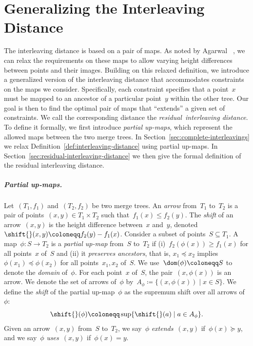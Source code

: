 \section{Generalizing the Interleaving Distance}\label{sec:generalizing-interleaving-distance}
The interleaving distance is based on a pair of maps.
As noted by Agarwal \etal~\cite{agarwal2018computing}, we can relax the requirements on these maps to allow varying height differences between points and their images.
Building on this relaxed definition, we introduce a generalized version of the interleaving distance that accommodates constraints on the maps we consider.
Specifically, each constraint specifies that a point~$x$ must be mapped to an ancestor of a particular point~$y$ within the other tree.
Our goal is then to find the optimal pair of maps that ``extends'' a given set of constraints.
We call the corresponding distance the \emph{residual~interleaving distance}.
To define it formally, we first introduce \emph{partial up-maps}, which represent the allowed maps between the two merge trees.
In Section~\ref{sec:complete-interleavings} we relax Definition~\ref{def:interleaving-distance} using partial up-maps.
In Section~\ref{sec:residual-interleaving-distance} we then give the formal definition of the residual interleaving distance.
%
\subparagraph{Partial up-maps.}
Let~$(T_1, f_1)$ and~$(T_2, f_2)$ be two merge trees.
An \emph{arrow} from~$T_1$ to~$T_2$ is a pair of points~$(x, y) \in T_1 \times T_2$ such that~$f_1(x) \le f_2(y)$.
The \emph{shift} of an arrow~$(x, y)$ is the height difference between~$x$ and~$y$, denoted~$\shift{}(x, y) \coloneqq f_2(y) - f_1(x)$.
Consider a subset of points~$S \subseteq T_1$.
A map~$\phi \colon S \to T_2$ is a \emph{partial up-map} from~$S$ to~$T_2$ if (i)~$f_2(\phi(x)) \ge f_1(x)$ for all points~$x$ of~$S$ and (ii) it \emph{preserves ancestors}, that is, $x_1 \preceq x_2$ implies~$\phi(x_1) \preceq \phi(x_2)$ for all points~$x_1, x_2$ of~$S$.
We use~$\dom(\phi) \coloneqq S$ to denote the \emph{domain} of~$\phi$.
For each point~$x$ of~$S$, the pair~$(x, \phi(x))$ is an arrow.
We denote the set of arrows of~$\phi$ by~$A_\phi \coloneqq \{(x, \phi(x)) \mid x \in S\}$.
We define the \emph{shift} of the partial up-map~$\phi$ as the supremum shift over all arrows of~$\phi$:
\begin{equation}\label{eq:shift}
    \shift{}(\phi) \coloneqq \sup\{\shift{}(a) \mid a \in A_\phi\}.
\end{equation}
%
Given an arrow~$(x, y)$ from~$S$ to~$T_2$, we say~$\phi$ \emph{extends}~$(x, y)$ if~$\phi(x) \succeq y$, and we say~$\phi$ \emph{uses}~$(x, y)$ if~$\phi(x) = y$.
